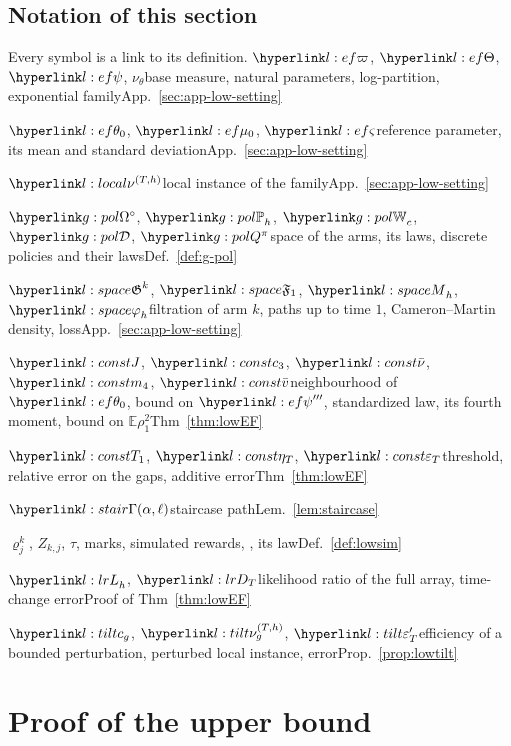 \documentclass[11pt]{article}
\newcommand{\E}{\mathbb{E}}
\newcommand{\1}{\mathbf{1}}
\begin{document}
\subsection{Notation of this section}\label{sec:app-low-notation}
Every symbol is a link to its definition.
\noindent $\lvp$, $\lTh$, $\lpsi$, $\nu_\theta$\quad base measure, natural parameters, log-partition, exponential family\hfill{\small App.~\ref{sec:app-low-setting}}\par
\noindent $\lthz$, $\lmuz$, $\lsd$\quad reference parameter, its mean and standard deviation\hfill{\small App.~\ref{sec:app-low-setting}}\par
\noindent $\lnuT$\quad local instance of the family\hfill{\small App.~\ref{sec:app-low-setting}}\par
\noindent $\gOs$, $\gPh_h$, $\gWi_c$, $\gDc$, $\gQp\pi$\quad space of the arms, its laws, discrete policies and their laws\hfill{\small Def.~\ref{def:g-pol}}\par
\noindent $\lG^k$, $\lFo$, $\lM_h$, $\lphi_h$\quad filtration of arm $k$, paths up to time $1$, Cameron--Martin density, loss\hfill{\small App.~\ref{sec:app-low-setting}}\par
\noindent $\lJ$, $\lcth$, $\lnub$, $\lmq$, $\lvb$\quad neighbourhood of $\lthz$, bound on $\lpsi'''$, standardized law, its fourth moment, bound on $\E\rho_1^2$\hfill{\small Thm~\ref{thm:lowEF}}\par
\noindent $\lTone$, $\letT$, $\lepT$\quad threshold, relative error on the gaps, additive error\hfill{\small Thm~\ref{thm:lowEF}}\par
\noindent $\lGam(\alpha,\ell)$\quad staircase path\hfill{\small Lem.~\ref{lem:staircase}}\par
\noindent $\varrho^k_j$, $Z_{k,j}$, $\tau$, \lsimpol\quad marks, simulated rewards, \lsimal, its law\hfill{\small Def.~\ref{def:lowsim}}\par
\noindent $\lL_h$, $\lDT$\quad likelihood ratio of the full array, time-change error\hfill{\small Proof of Thm~\ref{thm:lowEF}}\par
\noindent $\lcg$, $\lnug$, $\lepTp$\quad efficiency of a bounded perturbation, perturbed local instance, error\hfill{\small Prop.~\ref{prop:lowtilt}}\par

\section{Proof of the upper bound}\label{sec:app-upper}
\end{document}
